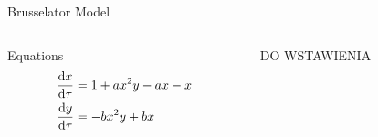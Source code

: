 \documentclass[xcolor]{beamer}
\begin{document}
\begin{frame}{Brusselator Model}
\begin{columns}
\begin{column}{0.5\textwidth}
\begin{block}{Equations}
\begin{align*}
\odv{x}{\tau} &= 1 + ax^{2}y - ax - x \\
\odv{y}{\tau} &= -bx^{2}y + bx
\end{align*}
\end{block}
\end{column}

\begin{column}{0.5\textwidth}
DO WSTAWIENIA
\end{column}
\end{columns}
\end{frame}
\end{document}

